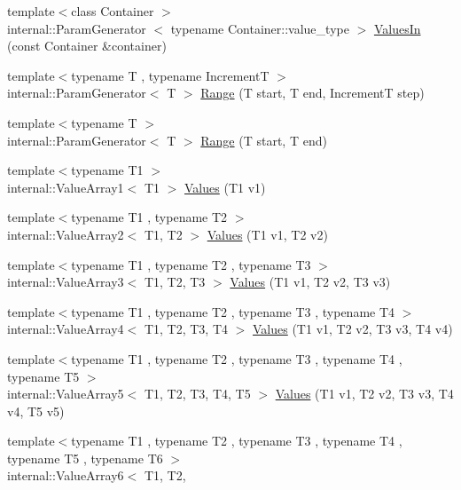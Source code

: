 \begin{DoxyCompactItemize}
\item 
{\footnotesize template$<$class Container $>$ }\\internal\-::\-Param\-Generator\*
$<$ typename \*
\-Container\-::value\-\_\-type $>$ \hyperlink{namespacetesting_af51aa340f8799c6f66852c2637c396d4}{\-Values\-In} (const \-Container \&container)
\item 
{\footnotesize template$<$typename T , typename Increment\-T $>$ }\\internal\-::\-Param\-Generator$<$ \-T $>$ \hyperlink{namespacetesting_a265ed70a86cf2d6641582c45ad9529e2}{\-Range} (\-T start, \-T end, \-Increment\-T step)
\item 
{\footnotesize template$<$typename T $>$ }\\internal\-::\-Param\-Generator$<$ \-T $>$ \hyperlink{namespacetesting_a56a45f85a1238dfc92e6fca03eb3a2e4}{\-Range} (\-T start, \-T end)
\item 
{\footnotesize template$<$typename T1 $>$ }\\internal\-::\-Value\-Array1$<$ \-T1 $>$ \hyperlink{namespacetesting_a8209ef59db08b8ad4beed30d8d6e6a88}{\-Values} (\-T1 v1)
\item 
{\footnotesize template$<$typename T1 , typename T2 $>$ }\\internal\-::\-Value\-Array2$<$ \-T1, \-T2 $>$ \hyperlink{namespacetesting_a7cfec131dd8773430fb87483509cc6d0}{\-Values} (\-T1 v1, \-T2 v2)
\item 
{\footnotesize template$<$typename T1 , typename T2 , typename T3 $>$ }\\internal\-::\-Value\-Array3$<$ \-T1, \-T2, \-T3 $>$ \hyperlink{namespacetesting_a344ca3522cb99a7b98801a9577993011}{\-Values} (\-T1 v1, \-T2 v2, \-T3 v3)
\item 
{\footnotesize template$<$typename T1 , typename T2 , typename T3 , typename T4 $>$ }\\internal\-::\-Value\-Array4$<$ \-T1, \-T2, \*
\-T3, \-T4 $>$ \hyperlink{namespacetesting_a4b14d4b6e471a1fb8ee3e5706dbc11c6}{\-Values} (\-T1 v1, \-T2 v2, \-T3 v3, \-T4 v4)
\item 
{\footnotesize template$<$typename T1 , typename T2 , typename T3 , typename T4 , typename T5 $>$ }\\internal\-::\-Value\-Array5$<$ \-T1, \-T2, \*
\-T3, \-T4, \-T5 $>$ \hyperlink{namespacetesting_aa2c5f97a44a14ae95da8313b115b6396}{\-Values} (\-T1 v1, \-T2 v2, \-T3 v3, \-T4 v4, \-T5 v5)
\item 
{\footnotesize template$<$typename T1 , typename T2 , typename T3 , typename T4 , typename T5 , typename T6 $>$ }\\internal\-::\-Value\-Array6$<$ \-T1, \-T2, \*

\end{DoxyCompactItemize}
